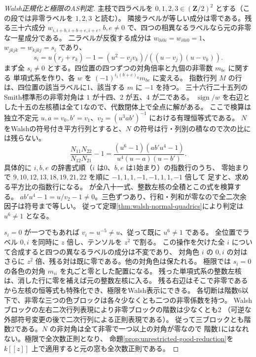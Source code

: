 \begin{proof}[Walsh正規化と極限のAS判定]
主枝で四ラベルを $0,1,2,3\in(\mathbf Z/2)^2$ とする（この段では非零ラベルを $1,2,3$ と読む）。
隣接ラベルが等しい成分は零である。残る三十六成分
$w_{i,i+b,i+b+e,i+e}$, $b,e\ne0$ で、四つの相異なるラベルなら元の非零な一星成分である。
二ラベルが反復する成分は $w_{0i0i}=w_{i0i0}=1$、
$w_{jkjk}=w_{kjkj}=s_i$ であり、
\[
       s_i=u(r_j+r_k)-1=(u^2-v_j v_k)/((u-v_j)(u-v_k)) .
\]
まず全 $s_i\ne0$ とする。四位置の四つずつの対角倍率と九個の非零数 $m_{be}$ に関する
単項式系を作り、各 $w$ を $(-1)^{i_1(b+e)_0}m_{be}$ に変える。
指数行列 $M$ の行は、四位置の該当ラベルに1、該当する $m$ に $-1$ を持つ。
三十六行二十五列のSmith標準形の非零対角は $1$ が十四、$2$ が五、$4$ が二である。
$\operatorname{sign}/w$ を右辺とした十五の左核積は全て1なので、代数閉体上で全点に解がある。
ここで検算は独立不定元 $u,a=v_0,b'=v_1$、$v_2=(u^3ab')^{-1}$ における有理恒等式である。
$N$ をWalshの符号付き平方行列とすると、$N$ の符号は行・列別の積なので次の比には残らない。
\[
 \frac{N_{11}N_{22}}{N_{12}N_{21}}-1
       =\frac{(u^6-1)(ab'u^4-1)}{u^4(u-a)(u-b')}.
\]
具体的に $i,b,e$ の辞書式順（$i$ は0、$b,e$ は1始まり）の指数行のうち、
零始まりで $9,10,12,13,18,19,21,22$ を順に $-1,1,1,-1,-1,1,1,-1$ 倍して
足すと、求める平方比の指数行になる。
 が全八十一式、整数左核の全積とこの式を検算する。
$ab'u^4-1=u/v_2-1\ne0$。三色ずつあり、行和・列和が零なので全二次余因子は符号まで等しい。
従って定理\ref{thm:walsh-normal-quadrics}により判定は $u^6\ne1$ となる。

$s_i=0$ が一つでもあれば $v_i=u^{-5}\ne u$、従って既に $u^6\ne1$ である。
全位置でラベル $0,i$ を同時に $z$ 倍し、テンソルを $z^2$ で割る。
この操作を欠けた全 $i$ について合成すると四つの異なるラベルの成分は不変であり、
対角色 $i$ の $0,i$ の対はさらに $z^2$ 倍、残る対は既に零である。他の対角色は保たれる。
極限では $s_i=0$ の各色の対角 $m_{ii}$ を丸ごと零とした配置になる。
残った単項式系の整数左核は、消した行に零を補えば元の整数左核に入る。
残る右辺はそこで非零であるから左核の恒等式も特殊化でき、極限をWalsh表示にできる。
各切断は階数6以下で、非零な三つの色ブロックは各々少なくとも二つの非零係数を持つ。
Walshブロックの左右二次行列表現により非零ブロックの階数は少なくとも2
（可逆な外部符号変更の後で二次行列による正則表現である）。
従って三ブロックとも階数2である。$N$ の非対角は全て非零で一つ以上の対角が零なので
階数1にはなれない。極限で全次数正則となり、
命題\ref{prop:unrestricted-good-reduction}を $k[[z]]$ 上で適用すると元の窓も全次数正則である。
\end{proof}

